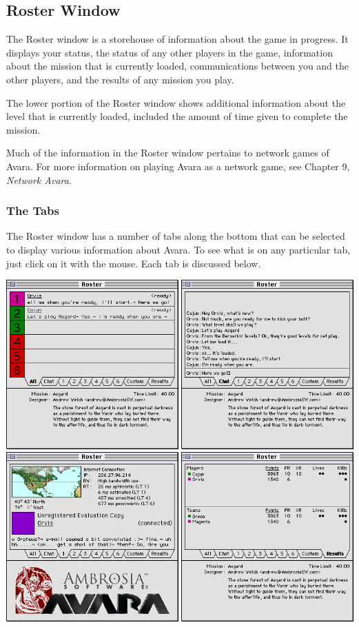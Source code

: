 \documentclass{article}
\begin{document}
\subsection{Roster Window}
The Roster window is a storehouse of information about the game in progress. It displays your status, the status of any other players in the game, information about the mission that is currently loaded, communications between you and the other players, and the results of any mission you play.

The lower portion of the Roster window shows additional information about the level that is currently loaded, included the amount of time given to complete the mission.

Much of the information in the Roster window pertains to network games of Avara. For more information on playing Avara as a network game, see Chapter 9, \textit{Network Avara}.

\subsubsection{The Tabs}
The Roster window has a number of tabs along the bottom that can be selected to display various information about Avara. To see what is on any particular tab, just click on it with the mouse. Each tab is discussed below.

\begin{center}
	\includegraphics[width=\textwidth]{img/06a.png}\\
\end{center}
\end{document}

